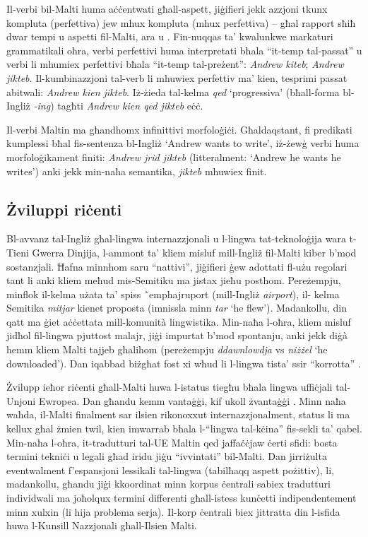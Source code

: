\documentclass[]{../../metanetpaper}
\begin{document}
\begin{multicols}{2}
Il-verbi bil-Malti huma aċċentwati għall-aspett, jiġifieri jekk azzjoni tkunx kompluta (perfettiva) jew mhux kompluta (mhux perfettiva) -- għal rapport sħiħ dwar tempi u aspetti fil-Malti, ara \cite{Fabri:1995} u \cite{Ebert:2000}. Fin-nuqqas ta’ kwalunkwe markaturi grammatikali oħra, verbi perfettivi huma interpretati bħala ``it-temp tal-passat'' u verbi li mhumiex perfettivi bħala ``it-temp tal-preżent'': \emph{Andrew kiteb}; \emph{Andrew jikteb}. Il-kumbinazzjoni tal-verb li mhuwiex perfettiv ma’ kien, tesprimi passat abitwali: \emph{Andrew kien jikteb}. Iż-żieda tal-kelma \emph{qed} `progressiva' (bħall-forma bl-Ingliż \emph{-ing}) tagħti \emph{Andrew kien qed jikteb} eċċ.

Il-verbi Maltin ma għandhomx infinittivi morfoloġiċi. Għaldaqstant, fi predikati kumplessi bħal fis-sentenza bl-Ingliż `Andrew wants to write', iż-żewġ verbi huma morfoloġikament finiti: \emph{Andrew jrid jikteb} (litteralment: `Andrew he wants he writes') anki jekk min-naħa semantika, \emph{jikteb} mhuwiex finit.

\subsection{Żviluppi riċenti}

Bl-avvanz tal-Ingliż għal-lingwa internazzjonali u l-lingwa tat-teknoloġija wara t-Tieni Gwerra Dinjija, l-ammont ta’ kliem misluf mill-Ingliż fil-Malti kiber b’mod sostanzjali. Ħafna minnhom saru ``nattivi'', jiġifieri ġew adottati fl-użu regolari tant li anki kliem meħud mis-Semitiku ma jistax jieħu posthom. Pereżempju, minflok il-kelma użata ta’ spiss ˜emph{ajruport} (mill-Ingliż \emph{airport}), il- kelma Semitika \emph{mitjar} kienet proposta (imnissla minn \emph{tar} `he flew'). Madankollu, din qatt ma ġiet aċċettata mill-komunità lingwistika. Min-naħa l-oħra, kliem misluf jidħol fil-lingwa pjuttost malajr, jiġi impurtat b’mod spontanju, anki jekk diġà hemm kliem Malti tajjeb għalihom (pereżempju \emph{ddawnlowdja} vs \emph{niżżel} `he downloaded'). Dan iqabbad biżgħat fost xi wħud li l-lingwa tista’ ssir ``korrotta'' \cite{Fabri:2011a}.

Żvilupp ieħor riċenti għall-Malti huwa l-istatus tiegħu bħala lingwa uffiċjali tal-Unjoni Ewropea. Dan għandu kemm vantaġġi, kif ukoll żvantaġġi \cite{Fabri:2011a}. Minn naħa waħda, il-Malti finalment sar ilsien rikonoxxut internazzjonalment, status li ma kellux għal żmien twil, kien imwarrab bħala l-``lingwa tal-kċina'' fis-sekli ta’ qabel. Min-naħa l-oħra, it-tradutturi tal-UE Maltin qed jaffaċċjaw ċerti sfidi: bosta termini tekniċi u legali għad iridu jiġu ``ivvintati'' bil-Malti. Dan jirriżulta eventwalment f’espansjoni lessikali tal-lingwa (tabilħaqq aspett pożittiv), li, madankollu, għandu jiġi kkoordinat minn korpus ċentrali sabiex tradutturi individwali ma joħolqux termini differenti għall-istess kunċetti indipendentement minn xulxin (li hija problema serja). Il-korp ċentrali biex jittratta din l-isfida huwa l-Kunsill Nazzjonali għall-Ilsien Malti.


\end{multicols}
\end{document}
